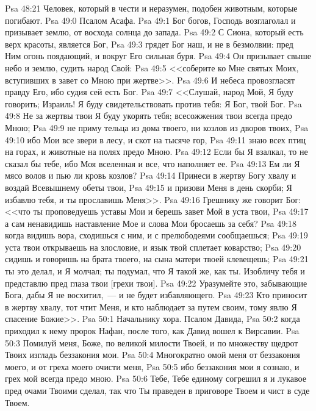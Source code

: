 \vs Psa 48:21 Человек, который в чести и неразумен, подобен животным, которые погибают.
\vs Psa 49:0 Псалом Асафа.
\rsbpar\vs Psa 49:1 Бог богов, Господь возглаголал и призывает землю, от восхода солнца до запада.
\vs Psa 49:2 С Сиона, который есть верх красоты, является Бог,
\vs Psa 49:3 грядет Бог наш, и не в безмолвии: пред Ним огонь поядающий, и вокруг Его сильная буря.
\vs Psa 49:4 Он призывает свыше небо и землю, судить народ Свой:
\vs Psa 49:5 <<соберите ко Мне святых Моих, вступивших в завет со Мною при жертве>>.
\vs Psa 49:6 И небеса провозгласят правду Его, ибо судия сей есть Бог.
\vs Psa 49:7 <<Слушай, народ Мой, Я буду говорить; Израиль! Я буду свидетельствовать против тебя: Я Бог, твой Бог.
\vs Psa 49:8 Не за жертвы твои Я буду укорять тебя; всесожжения твои всегда предо Мною;
\vs Psa 49:9 не приму тельца из дома твоего, ни козлов из дворов твоих,
\vs Psa 49:10 ибо Мои все звери в лесу, и скот на тысяче гор,
\vs Psa 49:11 знаю всех птиц на горах, и животные на полях предо Мною.
\vs Psa 49:12 Если бы Я взалкал, то не сказал бы тебе, ибо Моя вселенная и все, что наполняет ее.
\vs Psa 49:13 Ем ли Я мясо волов и пью ли кровь козлов?
\vs Psa 49:14 Принеси в жертву Богу хвалу и воздай Всевышнему обеты твои,
\vs Psa 49:15 и призови Меня в день скорби; Я избавлю тебя, и ты прославишь Меня>>.
\vs Psa 49:16 Грешнику же говорит Бог: <<что ты проповедуешь уставы Мои и берешь завет Мой в уста твои,
\vs Psa 49:17 а сам ненавидишь наставление Мое и слова Мои бросаешь за себя?
\vs Psa 49:18 когда видишь вора, сходишься с ним, и с прелюбодеями сообщаешься;
\vs Psa 49:19 уста твои открываешь на злословие, и язык твой сплетает коварство;
\vs Psa 49:20 сидишь и говоришь на брата твоего, на сына матери твоей клевещешь;
\vs Psa 49:21 ты это делал, и Я молчал; ты подумал, что Я такой же, как ты. Изобличу тебя и представлю пред глаза твои [грехи твои].
\vs Psa 49:22 Уразумейте это, забывающие Бога, дабы Я не восхитил,~--- и не будет избавляющего.
\vs Psa 49:23 Кто приносит в жертву хвалу, тот чтит Меня, и кто наблюдает за путем своим, тому явлю Я спасение Божие>>.
\vs Psa 50:1 Начальнику хора. Псалом Давида,
\vs Psa 50:2 когда приходил к нему пророк Нафан, после того, как Давид вошел к Вирсавии.
\rsbpar\vs Psa 50:3 Помилуй меня, Боже, по великой милости Твоей, и по множеству щедрот Твоих изгладь беззакония мои.
\vs Psa 50:4 Многократно омой меня от беззакония моего, и от греха моего очисти меня,
\vs Psa 50:5 ибо беззакония мои я сознаю, и грех мой всегда предо мною.
\vs Psa 50:6 Тебе, Тебе единому согрешил я и лукавое пред очами Твоими сделал, так что Ты праведен в приговоре Твоем и чист в суде Твоем.
